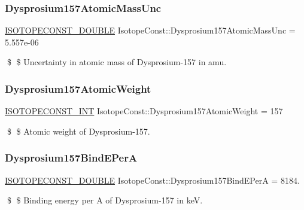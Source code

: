 \subsubsection{\texorpdfstring{Dysprosium157\+Atomic\+Mass\+Unc}{Dysprosium157AtomicMassUnc}}
{\footnotesize\ttfamily \mbox{\hyperlink{group___isotope_const-_macros_ga8f45a7272ce02c0b4c65c44636ed719a}{I\+S\+O\+T\+O\+P\+E\+C\+O\+N\+S\+T\+\_\+\+D\+O\+U\+B\+LE}} Isotope\+Const\+::\+Dysprosium157\+Atomic\+Mass\+Unc = 5.\+557e-\/06}

\$ \$ Uncertainty in atomic mass of Dysprosium-\/157 in amu. \mbox{\label{group___isotope_const-_dysprosium-_dy157_ga2a76dd44b97da4ae808b1686a96fce5f}} 
\subsubsection{\texorpdfstring{Dysprosium157\+Atomic\+Weight}{Dysprosium157AtomicWeight}}
{\footnotesize\ttfamily \mbox{\hyperlink{group___isotope_const-_macros_ga5f18360b3e99483a35c32d789e62621c}{I\+S\+O\+T\+O\+P\+E\+C\+O\+N\+S\+T\+\_\+\+I\+NT}} Isotope\+Const\+::\+Dysprosium157\+Atomic\+Weight = 157}

\$ \$ Atomic weight of Dysprosium-\/157. \mbox{\label{group___isotope_const-_dysprosium-_dy157_gabea2563c222a22b7aae0fb0ac66d51c4}} 
\subsubsection{\texorpdfstring{Dysprosium157\+Bind\+E\+PerA}{Dysprosium157BindEPerA}}
{\footnotesize\ttfamily \mbox{\hyperlink{group___isotope_const-_macros_ga8f45a7272ce02c0b4c65c44636ed719a}{I\+S\+O\+T\+O\+P\+E\+C\+O\+N\+S\+T\+\_\+\+D\+O\+U\+B\+LE}} Isotope\+Const\+::\+Dysprosium157\+Bind\+E\+PerA = 8184.}

\$ \$ Binding energy per A of Dysprosium-\/157 in keV. \mbox{\label{group___isotope_const-_dysprosium-_dy157_gaeeb06984f6325d629b0881b5f988d85c}} 

